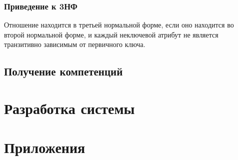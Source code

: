 \documentclass[PI,KR]{HSEUniversity}
\begin{document}
\subsection{Приведение к 3НФ}
Отношение находится в третьей нормальной форме, если оно находится во второй нормальной форме, и каждый неключевой атрибут не является транзитивно зависимым от первичного ключа.
\section{Получение компетенций}

\chapter{Разработка системы}


\putbibliography %
\chapter*{Приложения}
\end{document}
